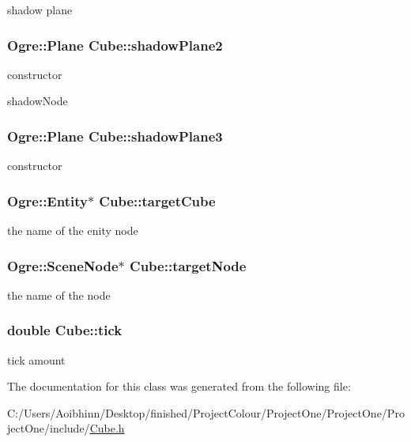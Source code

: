 shadow plane \hypertarget{class_cube_a50238beea54f1107761f375870b504ea}{
\subsubsection[{shadow\-Plane2}]{\setlength{\rightskip}{0pt plus 5cm}Ogre\-::\-Plane Cube\-::shadow\-Plane2}}\label{class_cube_a50238beea54f1107761f375870b504ea}
constructor

shadow\-Node \hypertarget{class_cube_a26706404bc0586106f3ce0539b5aefb9}{
\subsubsection[{shadow\-Plane3}]{\setlength{\rightskip}{0pt plus 5cm}Ogre\-::\-Plane Cube\-::shadow\-Plane3}}\label{class_cube_a26706404bc0586106f3ce0539b5aefb9}
constructor \hypertarget{class_cube_a9af90d4cbb6956867599962f58144322}{
\subsubsection[{target\-Cube}]{\setlength{\rightskip}{0pt plus 5cm}Ogre\-::\-Entity$\ast$ Cube\-::target\-Cube}}\label{class_cube_a9af90d4cbb6956867599962f58144322}
the name of the enity node \hypertarget{class_cube_a8ff3abf1bb201413140c23d870961ea2}{
\subsubsection[{target\-Node}]{\setlength{\rightskip}{0pt plus 5cm}Ogre\-::\-Scene\-Node$\ast$ Cube\-::target\-Node}}\label{class_cube_a8ff3abf1bb201413140c23d870961ea2}
the name of the node \hypertarget{class_cube_a46f7e77fdc6bd86d23c36553356bded6}{
\subsubsection[{tick}]{\setlength{\rightskip}{0pt plus 5cm}double Cube\-::tick}}\label{class_cube_a46f7e77fdc6bd86d23c36553356bded6}
tick amount 

The documentation for this class was generated from the following file\-:\begin{DoxyCompactItemize}
\item 
C\-:/\-Users/\-Aoibhinn/\-Desktop/finished/\-Project\-Colour/\-Project\-One/\-Project\-One/\-Project\-One/include/\hyperlink{_cube_8h}{Cube.\-h}\end{DoxyCompactItemize}
